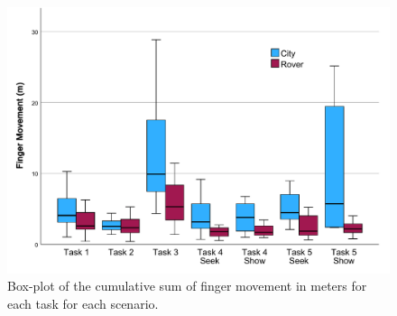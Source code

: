             \begin{figure}[h]
                \centering
                \includegraphics[width=1\linewidth]{figures/finger_movement_graph.pdf}
                \caption{Box-plot of the cumulative sum of finger movement in meters for each task for each scenario.}
                \label{fig:finger_movement}
            \end{figure}



